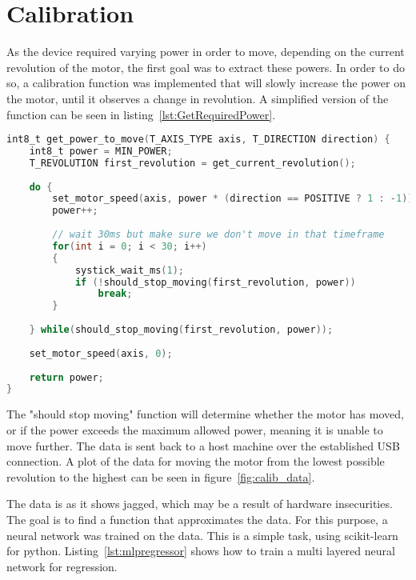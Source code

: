 \section{Calibration}

As the device required varying power in order to move, depending on the current revolution of the motor, the first goal was to extract these powers.
In order to do so, a calibration function was implemented that will slowly increase the power on the motor, until it observes a change in revolution.
A simplified version of the function can be seen in listing~\ref{lst:GetRequiredPower}.


\begin{lstlisting}[language=C,label={lst:GetRequiredPower},caption={Getting required power to move }]
int8_t get_power_to_move(T_AXIS_TYPE axis, T_DIRECTION direction) {
	int8_t power = MIN_POWER;
	T_REVOLUTION first_revolution = get_current_revolution();
	
	do {
		set_motor_speed(axis, power * (direction == POSITIVE ? 1 : -1));
		power++;
		
		// wait 30ms but make sure we don't move in that timeframe
		for(int i = 0; i < 30; i++)
		{
			systick_wait_ms(1);
			if (!should_stop_moving(first_revolution, power))
				break;
		}
	
	} while(should_stop_moving(first_revolution, power));
	
	set_motor_speed(axis, 0);
	
	return power;
}

\end{lstlisting}

The "should stop moving" function will determine whether the motor has moved, or if the power exceeds the maximum allowed power, meaning it is unable to move further.
The data is sent back to a host machine over the established USB connection.
A plot of the data for moving the motor from the lowest possible revolution to the highest can be seen in figure~\ref{fig:calib_data}.


The data is as it shows jagged, which may be a result of hardware insecurities.
The goal is to find a function that approximates the data.
For this purpose, a neural network was trained on the data.
This is a simple task, using scikit-learn for python.
Listing~\ref{lst:mlpregressor} shows how to train a multi layered neural network for regression.


